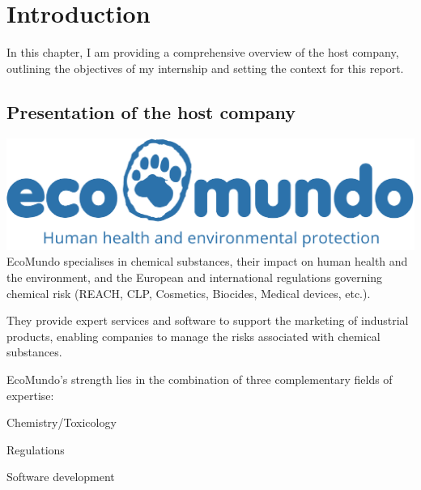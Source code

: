 \documentclass[a4paper,12pt,twoside]{report}
\begin{document}

\thispagestyle{empty}



\newpage

\chapter{Introduction}
In this chapter, I am providing a comprehensive overview of the host company, outlining the objectives of my internship and setting the context for this report.
\section{Presentation of the host company}
\includegraphics[width=\textwidth]{images/ecomundo}
EcoMundo \cite{ecomundo} specialises in chemical substances, their impact on human health and the environment, and the European and international regulations governing chemical risk (REACH, CLP, Cosmetics, Biocides, Medical devices, etc.).

They provide expert services and software to support the marketing of industrial products, enabling companies to manage the risks associated with chemical substances.

EcoMundo's strength lies in the combination of three complementary fields of expertise:

\itemize[label=$\bullet$] 
\item Chemistry/Toxicology
\item Regulations
\item Software development
\end{document}
